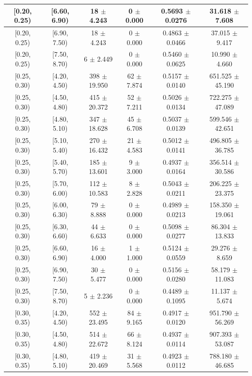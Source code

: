 \begin{longtable}{|c|c|c|c|c|c|}
\hline
[0.20, 0.25) & [6.60, 6.90) & 18 $\pm$ 4.243 & 0 $\pm$ 0.000 & 0.5693 $\pm$ 0.0276 & 31.618 $\pm$ 7.608 \\ 
\hline
[0.20, 0.25) & [6.90, 7.50) & 18 $\pm$ 4.243 & 0 $\pm$ 0.000 & 0.4863 $\pm$ 0.0466 & 37.015 $\pm$ 9.417 \\ 
\hline
[0.20, 0.25) & [7.50, 8.70) & 6 $\pm$ 2.449 & 0 $\pm$ 0.000 & 0.5460 $\pm$ 0.0625 & 10.990 $\pm$ 4.660 \\ 
\hline
[0.25, 0.30) & [4.20, 4.50) & 398 $\pm$ 19.950 & 62 $\pm$ 7.874 & 0.5157 $\pm$ 0.0140 & 651.525 $\pm$ 45.190 \\ 
\hline
[0.25, 0.30) & [4.50, 4.80) & 415 $\pm$ 20.372 & 52 $\pm$ 7.211 & 0.5026 $\pm$ 0.0134 & 722.275 $\pm$ 47.089 \\ 
\hline
[0.25, 0.30) & [4.80, 5.10) & 347 $\pm$ 18.628 & 45 $\pm$ 6.708 & 0.5037 $\pm$ 0.0139 & 599.546 $\pm$ 42.651 \\ 
\hline
[0.25, 0.30) & [5.10, 5.40) & 270 $\pm$ 16.432 & 21 $\pm$ 4.583 & 0.5012 $\pm$ 0.0141 & 496.805 $\pm$ 36.785 \\ 
\hline
[0.25, 0.30) & [5.40, 5.70) & 185 $\pm$ 13.601 & 9 $\pm$ 3.000 & 0.4937 $\pm$ 0.0164 & 356.514 $\pm$ 30.586 \\ 
\hline
[0.25, 0.30) & [5.70, 6.00) & 112 $\pm$ 10.583 & 8 $\pm$ 2.828 & 0.5043 $\pm$ 0.0211 & 206.225 $\pm$ 23.375 \\ 
\hline
[0.25, 0.30) & [6.00, 6.30) & 79 $\pm$ 8.888 & 0 $\pm$ 0.000 & 0.4989 $\pm$ 0.0213 & 158.350 $\pm$ 19.061 \\ 
\hline
[0.25, 0.30) & [6.30, 6.60) & 44 $\pm$ 6.633 & 0 $\pm$ 0.000 & 0.5098 $\pm$ 0.0277 & 86.304 $\pm$ 13.833 \\ 
\hline
[0.25, 0.30) & [6.60, 6.90) & 16 $\pm$ 4.000 & 1 $\pm$ 1.000 & 0.5124 $\pm$ 0.0559 & 29.276 $\pm$ 8.659 \\ 
\hline
[0.25, 0.30) & [6.90, 7.50) & 30 $\pm$ 5.477 & 0 $\pm$ 0.000 & 0.5156 $\pm$ 0.0280 & 58.179 $\pm$ 11.083 \\ 
\hline
[0.25, 0.30) & [7.50, 8.70) & 5 $\pm$ 2.236 & 0 $\pm$ 0.000 & 0.4489 $\pm$ 0.1095 & 11.137 $\pm$ 5.674 \\ 
\hline
[0.30, 0.35) & [4.20, 4.50) & 552 $\pm$ 23.495 & 84 $\pm$ 9.165 & 0.4917 $\pm$ 0.0120 & 951.790 $\pm$ 56.269 \\ 
\hline
[0.30, 0.35) & [4.50, 4.80) & 514 $\pm$ 22.672 & 66 $\pm$ 8.124 & 0.4937 $\pm$ 0.0114 & 907.393 $\pm$ 53.087 \\ 
\hline
[0.30, 0.35) & [4.80, 5.10) & 419 $\pm$ 20.469 & 31 $\pm$ 5.568 & 0.4923 $\pm$ 0.0112 & 788.180 $\pm$ 46.685 \\ 

\end{longtable}
